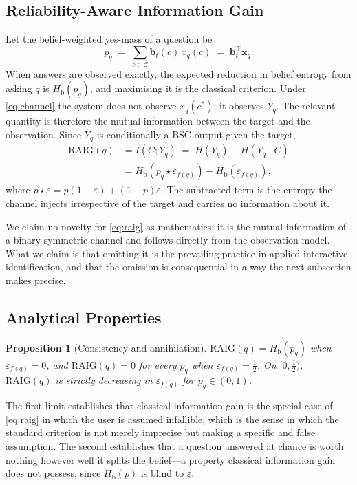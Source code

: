 \documentclass[conference]{IEEEtran}
\newcommand{\bx}{\mathbf{x}}
\newcommand{\bb}{\mathbf{b}}
\newcommand{\Hb}{H_{\mathrm{b}}}
\newcommand{\RAIG}{\mathrm{RAIG}}
\newcommand{\Cat}{\mathcal{C}}
\newtheorem{proposition}{Proposition}
\begin{document}
\subsection{Reliability-Aware Information Gain}

Let the belief-weighted yes-mass of a question be
\begin{equation}
p_q \;=\; \sum_{c \in \Cat} \bb_t(c)\, x_q(c) \;=\; \bb_t^{\!\top} \bx_q .
\end{equation}
When answers are observed exactly, the expected reduction in belief entropy
from asking $q$ is $\Hb(p_q)$, and maximising it is the classical criterion.
Under \eqref{eq:channel} the system does not observe $x_q(c^\ast)$; it observes
$Y_q$. The relevant quantity is therefore the mutual information between the
target and the observation. Since $Y_q$ is conditionally a BSC output given the
target,
\begin{align}
\RAIG(q)
&= I(C; Y_q) \;=\; H(Y_q) - H(Y_q \mid C) \nonumber\\
&= \Hb\!\left(p_q \star \varepsilon_{f(q)}\right) - \Hb\!\left(\varepsilon_{f(q)}\right),
\label{eq:raig}
\end{align}
where $p \star \varepsilon = p(1-\varepsilon)+(1-p)\varepsilon$. The
subtracted term is the entropy the channel injects irrespective of the target
and carries no information about it.

We claim no novelty for \eqref{eq:raig} as mathematics: it is the mutual
information of a binary symmetric channel and follows directly from the
observation model. What we claim is that omitting it is the prevailing practice
in applied interactive identification, and that the omission is consequential
in a way the next subsection makes precise.

\subsection{Analytical Properties}

\begin{proposition}[Consistency and annihilation]
\label{prop:limits}
$\RAIG(q) = \Hb(p_q)$ when $\varepsilon_{f(q)}=0$, and $\RAIG(q)=0$ for every
$p_q$ when $\varepsilon_{f(q)}=\tfrac12$. On $[0,\tfrac12)$, $\RAIG(q)$ is
strictly decreasing in $\varepsilon_{f(q)}$ for $p_q \in (0,1)$.
\end{proposition}

The first limit establishes that classical information gain is the special case
of \eqref{eq:raig} in which the user is assumed infallible, which is the sense
in which the standard criterion is not merely imprecise but making a specific
and false assumption. The second establishes that a question answered at chance
is worth nothing however well it splits the belief---a property classical
information gain does not possess, since $\Hb(p)$ is blind to $\varepsilon$.
\end{document}
